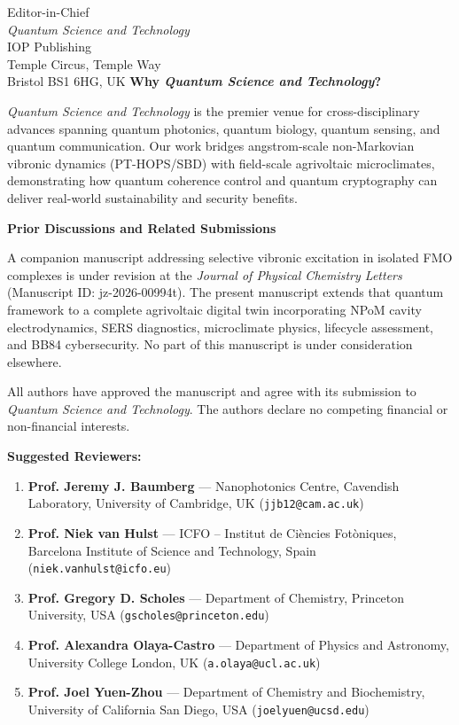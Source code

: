 \documentclass[12pt]{letter}
\begin{document}
\begin{letter}{Editor-in-Chief\\
\textit{Quantum Science and Technology}\\
IOP Publishing\\
Temple Circus, Temple Way\\
Bristol BS1 6HG, UK}
\vspace{0.5em}
\noindent\textbf{Why \textit{Quantum Science and Technology}?}\nopagebreak

\noindent\textit{Quantum Science and Technology} is the premier venue for cross-disciplinary advances spanning quantum photonics, quantum biology, quantum sensing, and quantum communication. Our work bridges angstrom-scale non-Markovian vibronic dynamics (PT-HOPS/SBD) with field-scale agrivoltaic microclimates, demonstrating how quantum coherence control and quantum cryptography can deliver real-world sustainability and security benefits.

\vspace{0.5em}
\noindent\textbf{Prior Discussions and Related Submissions}

\noindent A companion manuscript addressing selective vibronic excitation in isolated FMO complexes is under revision at the \textit{Journal of Physical Chemistry Letters} (Manuscript ID: jz-2026-00994t). The present manuscript extends that quantum framework to a complete agrivoltaic digital twin incorporating NPoM cavity electrodynamics, SERS diagnostics, microclimate physics, lifecycle assessment, and BB84 cybersecurity. No part of this manuscript is under consideration elsewhere.

\noindent All authors have approved the manuscript and agree with its submission to \textit{Quantum Science and Technology}. The authors declare no competing financial or non-financial interests.

\vspace{0.5em}
\noindent\textbf{Suggested Reviewers:}
\begin{enumerate}[nosep]
\item \textbf{Prof. Jeremy J. Baumberg} --- Nanophotonics Centre, Cavendish Laboratory, University of Cambridge, UK (\texttt{jjb12@cam.ac.uk})
\item \textbf{Prof. Niek van Hulst} --- ICFO -- Institut de Ci\`{e}ncies Fot\`{o}niques, Barcelona Institute of Science and Technology, Spain (\texttt{niek.vanhulst@icfo.eu})
\item \textbf{Prof. Gregory D. Scholes} --- Department of Chemistry, Princeton University, USA (\texttt{gscholes@princeton.edu})
\item \textbf{Prof. Alexandra Olaya-Castro} --- Department of Physics and Astronomy, University College London, UK (\texttt{a.olaya@ucl.ac.uk})
\item \textbf{Prof. Joel Yuen-Zhou} --- Department of Chemistry and Biochemistry, University of California San Diego, USA (\texttt{joelyuen@ucsd.edu})
\end{enumerate}


\end{letter}
\end{document}
